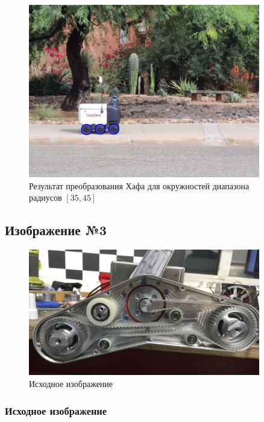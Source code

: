 
\begin{figure}[H]
    \centering
    \includegraphics[width=0.9\textwidth]{../outputs/image7_canny_r3045.png}
    \caption{Результат преобразования Хафа для окружностей диапазона радиусов $[35, 45]$}
\end{figure}


\subsection{Изображение №3}

\begin{figure}[H]
    \centering
    \includegraphics[width=0.9\textwidth]{../source/8.png}
    \caption{Исходное изображение}
\end{figure}

\subsubsection{Исходное изображение}

